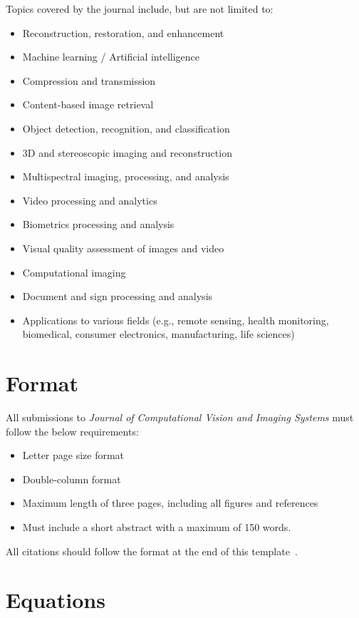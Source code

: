 \documentclass[letterpaper]{CVIS}
\begin{document}
Topics covered by the journal include, but are not limited to:

\begin{itemize}
	\item Reconstruction, restoration, and enhancement
	\item Machine learning / Artificial intelligence
	\item Compression and transmission
	\item Content-based image retrieval
	\item Object detection, recognition, and classification
	\item 3D and stereoscopic imaging and reconstruction
	\item Multispectral imaging, processing, and analysis
	\item Video processing and analytics
	\item Biometrics processing and analysis
	\item Visual quality assessment of images and video
	\item Computational imaging
	\item Document and sign processing and analysis
	\item Applications to various fields (e.g., remote sensing, health monitoring, biomedical, consumer electronics, manufacturing, life sciences)
\end{itemize}

\section{Format}

All submissions to \textit{Journal of Computational Vision and Imaging Systems} must follow the below requirements:

\begin{itemize}
	\item Letter page size format
	\item Double-column format
	\item Maximum length of three pages, including all figures and references
	\item Must include a short abstract with a maximum of 150 words.
\end{itemize}

All citations should follow the format at the end of this template~\cite{Siva,Siva2}.

\section{Equations}
\end{document}
